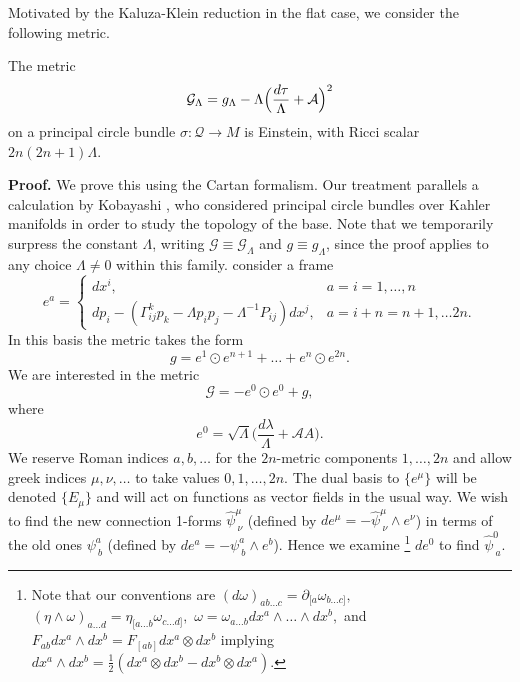 Motivated by the Kaluza-Klein reduction in the flat case, we consider
the following metric.
\begin{theo}
The metric
\begin{equation}
\mathcal{G}_{\Lambda}=g_{\Lambda}-\Lambda\Bigl(\frac{ d\tau}{\Lambda}+\mathcal{A}\Bigr)^{2}\label{eq:G}
\end{equation}
on a principal circle bundle $\sigma:\mathcal{Q}\rightarrow M$ is Einstein,
with Ricci scalar $2n(2n+1)\Lambda$.
\end{theo}
\textbf{Proof.} We prove this using the Cartan formalism. Our treatment
parallels a calculation by Kobayashi \cite{Kobayashi1963}, who considered
principal circle bundles over Kahler manifolds in order to study the
topology of the base. Note that we temporarily surpress the constant
$\Lambda$, writing $\mathcal{G}\equiv\mathcal{G}_{\Lambda}$ and
$g\equiv g_{\Lambda}$, since the proof applies to any choice $\Lambda\neq0$
within this family. consider a frame
\begin{equation}
e^{a}=\begin{cases}
 dx^{i}, & a=i=1,\dots,n\\
 dp_{i}-(\Gamma_{ij}^{k}p_{k}-\Lambda p_{i}p_{j}-\Lambda^{-1}P_{ij}) dx^{j}, & a=i+n=n+1,\dots2n.
\end{cases}\label{eq:basis}
\end{equation}
In this basis the metric takes the form
\begin{equation}
g=e^{1}\odot e^{n+1}+\dots+e^{n}\odot e^{2n}.\label{eq:g_cov_const}
\end{equation}
We are interested in the metric
\[
\mathcal{G}=-e^{0}\odot e^{0}+g,
\]
where
\[
e^{0}=\sqrt{\Lambda}\biggl(\frac{ d\lambda}{\Lambda}+\mathcal{A}A\biggr).
\]
 We reserve Roman indices $a,b,\dots$ for the $2n$-metric components
$1,\dots,2n$ and allow greek indices $\mu,\nu,\dots$ to take values
$0,1,\dots,2n$. The dual basis to $\{e^{\mu}\}$ will be denoted
$\{E_{\mu}\}$ and will act on functions as vector fields in the usual
way. We wish to find the new connection 1-forms $\hat{\psi}_{\ \nu}^{\mu}$
(defined by $ de^{\mu}=-\hat{\psi}_{\ \nu}^{\mu}\wedge e^{\nu}$)
in terms of the old ones $\psi_{\ b}^{a}$ (defined by $ de^{a}=-\psi_{\ b}^{a}\wedge e^{b}$).
Hence we examine
\footnote{Note that our conventions are $(d\omega)_{ab\dots c}=\partial_{[a}\omega_{b\dots c]},$
$(\eta\wedge\omega)_{a\dots d}=\eta_{[a\dots b}\omega_{c\dots d]},$
$\omega=\omega_{a\dots b}dx^{a}\wedge\dots\wedge dx^{b},$
and $F_{ab}{d}x^{a}\wedge{d}x^{b}=F_{[ab]}{d}x^{a}\otimes{d}x^{b}$
implying ${d}x^{a}\wedge{d}x^{b}=\frac{1}{2}({d}x^{a}\otimes{d}x^{b}-{d}x^{b}\otimes{d}x^{a})$.
} ${d}e^{0}$ to find $\hat{\psi}_{\ a}^{0}.$

